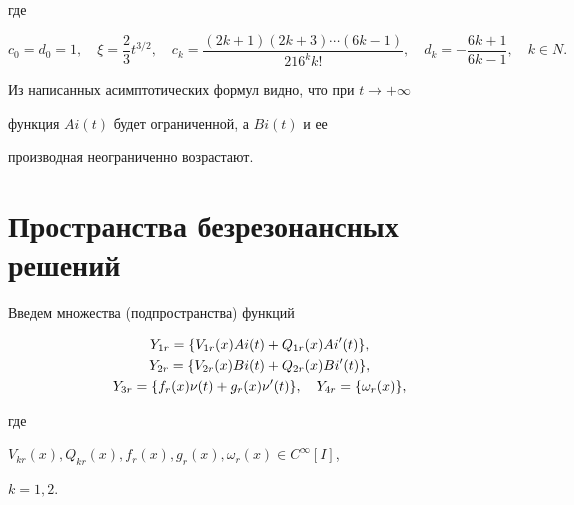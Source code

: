 где


$$


c_{0} = d_{0} = 1, \quad \xi = \frac{{2}}{{3}}t^{3/2}, \quad


c_{k} = \frac{{({2k + 1})({2k + 3})


\dotsb ({6k - 1})}}{{216^{k} k!}},


\quad d_k = -\frac{6k+1}{6k-1}, \quad k \in N.


$$





Из написанных асимптотических формул видно, что при $ t \to +\infty$


функция $Ai(t)$ будет ограниченной, а $Bi(t)$ и ее


производная неограниченно возрастают.








\section{Пространства безрезонансных решений}





Введем множества (подпространства) функций


\begin{gather}


Y_{1r} = \{ V_{1r} (x) {Ai}(t) +


Q_{1r} (x) {Ai}'(t) \}, \notag \\


%


\label{2.1} Y_{2r} = \{ {V_{2r}(x) Bi (t) + Q_{2r}


(x)Bi'(t)} \}, \\


%


Y_{3r} = \{ {f_{r} ({x})\nu ({t}) +


g_{r} ({x}){\nu }' ({t})} \},


\quad Y_{4r} = \{ {\omega _{r} ({x})} \},\notag


\end{gather}


где


$V_{kr} ({x}), Q_{kr} ({x}),


f_{r} ({x}), g_{r} ({x}),


\omega_{r} ({x}) \in C^{\infty } [ {I} ]$,


$k=1,2$.


